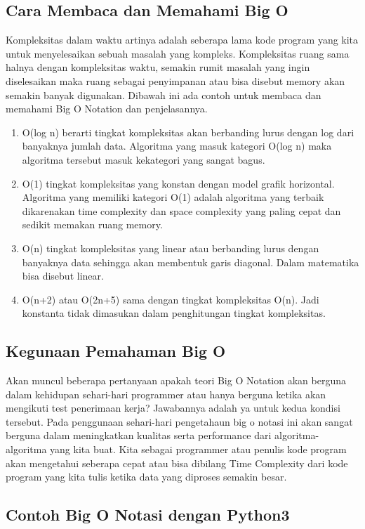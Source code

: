 \subsection{Cara Membaca dan Memahami Big O}
Kompleksitas dalam waktu artinya adalah seberapa lama kode program yang kita untuk menyelesaikan sebuah masalah yang kompleks. Kompleksitas ruang sama halnya dengan kompleksitas waktu, semakin rumit masalah yang ingin diselesaikan maka ruang sebagai penyimpanan atau bisa disebut memory akan semakin banyak digunakan. Dibawah ini ada contoh untuk membaca dan memahami Big O Notation dan penjelasannya.
\begin{enumerate}
\item O(log n) berarti tingkat kompleksitas akan berbanding lurus dengan log dari banyaknya jumlah data. Algoritma yang masuk kategori O(log n) maka algoritma tersebut masuk kekategori yang sangat bagus.
\item O(1) tingkat kompleksitas yang konstan dengan model grafik horizontal. Algoritma yang memiliki kategori O(1) adalah algoritma yang terbaik dikarenakan time complexity dan space complexity yang paling cepat dan sedikit memakan ruang memory.
\item O(n) tingkat kompleksitas yang linear atau berbanding lurus dengan banyaknya data sehingga akan membentuk garis diagonal. Dalam matematika bisa disebut linear.
\item O(n+2) atau O(2n+5) sama dengan tingkat kompleksitas O(n). Jadi konstanta tidak dimasukan dalam penghitungan tingkat kompleksitas.
\end{enumerate}

\subsection{Kegunaan Pemahaman Big O}
Akan muncul beberapa pertanyaan apakah teori Big O Notation akan berguna dalam kehidupan sehari-hari programmer atau hanya berguna ketika akan mengikuti test penerimaan kerja? Jawabannya adalah ya untuk kedua kondisi tersebut. Pada penggunaan sehari-hari pengetahaun big o notasi ini akan sangat berguna dalam meningkatkan kualitas serta performance dari algoritma-algoritma yang kita buat. Kita sebagai programmer atau penulis kode program akan mengetahui seberapa cepat atau bisa dibilang Time Complexity dari kode program yang kita tulis ketika data yang diproses semakin besar.

\subsection{Contoh Big O Notasi dengan Python3}

